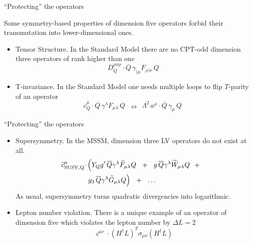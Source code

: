 \documentclass[pdf,UofT06talk,slideColor,colorBG,accumulate]{prosper}
\newcommand{\wt}{\widetilde}
\newcommand{\ov}{\overline}
\begin{document}
\begin{slide}{``Protecting'' the operators}

        Some symmetry-based properties of dimension five operators forbid
        their transmutation into lower-dimensional ones.
	
\begin{itemize}
\item	{\myit Tensor Structure}. In the Standard Model there are no
	CPT-odd dimension three operators of rank higher than one
\[
	D_{Q}^{\mu\nu\rho} \cdot
	\ov{Q}\, \gamma_{(\mu} F_{\rho)\nu}\, Q
\]

\item	{\myit T-invariance}. In the Standard Model one needs multiple
	loops to flip $ T $-parity of an operator
\[
	c_{Q}^\mu \cdot
	\ov{Q}\, \gamma^\lambda F_{\mu\lambda}\, Q
	~~\nrightarrow~~
	\Lambda^2 \, a^\mu \cdot \ov{Q}\, \gamma_\mu\, Q~
\]

\end{itemize}

\end{slide}


\begin{slide}{``Protecting'' the operators}

\begin{itemize}
\item 	{\myit Supersymmetry}. 
	In the MSSM, dimension three LV operators do not exist at all.
\begin{align*}
	\wt{c}_{\rm SUSY,Q}^\mu \cdot 
	&
	\left( 
	Y_Q g'\, \ov{Q} \gamma^\lambda \wt{F}_{\mu\lambda} Q   ~~+~~
	g\,  \ov{Q} \gamma^\lambda \wt{W}_{\mu\lambda} Q   ~~+~~
	\right . 
	\\
	& 
	\left .
	g_3\, \ov{Q} \gamma^\lambda \wt{G}_{\mu\lambda} Q 
	\right)  ~~+~~
	\ldots~
\end{align*}
	As usual, supersymmetry turns quadratic divergencies into
	logarithmic.

\item	{\myit Lepton number violation}.
	There is a unique example of an operator of dimension five
	which violates the lepton number by $ \Delta L = 2 $
\[
	\varsigma^{\mu\nu} \cdot
	\left( H^\dag L \right)^T \sigma_{\mu\nu} \left( H^\dag L \right)
\]

\end{itemize}

\end{slide}
\end{document}
